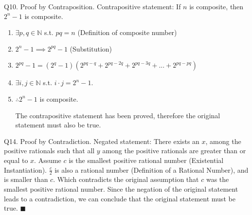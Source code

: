 \documentclass{article}
\begin{document}
				Q10. Proof by Contraposition. Contrapositive statement: If $n$ is composite, then $2^{n} - 1$ is composite.

					\begin{enumerate}
						\item  $\exists p,q \in \mathbb{N}$ s.t. $pq = n$ (Definition of composite number)
						\item $2^{n} - 1 \implies 2^{pq} - 1$ (Substitution)
						\item $2^{pq} - 1 = (2^{q} - 1)(2^{pq-q} + 2^{pq - 2q} + 2^{pq-3q}+...+2^{pq - pq})$
						\item $\exists i, j \in \mathbb{N}$ s.t. $i\cdot j = 2^{n} - 1$.
						\item $\therefore 2^{n} - 1$ is composite. 
						
						The contrapositive statement has been proved, therefore the original statement must also be true.
					\end{enumerate}
				Q14. Proof by Contradiction. Negated statement: There exists an $x$, among the positive rationals such that all $y$ among the positive rationals are greater than or equal to $x$. Assume $c$ is the smallest positive rational number (Existential Instantiation). $\frac{c}{2}$ is also a rational number (Definition of a Rational Number), and is smaller than $c$. Which contradicts the original assumption that $c$ was the smallest positive rational number. \newline
					Since the negation of the original statement leads to a contradiction, we can conclude that the original statement must be true. $\blacksquare$
					
		
\end{document}
